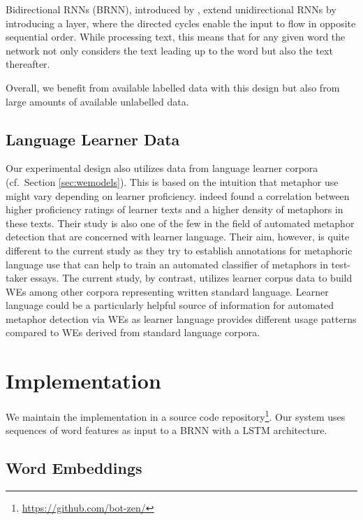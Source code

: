 \documentclass[11pt,a4paper]{article}
\begin{document}
Bidirectional RNNs (BRNN), introduced by , extend unidirectional RNNs by introducing a layer, where the directed cycles enable the input to flow in opposite sequential order. 
While processing text, this means that for any given word the network not only considers the text leading up to the word but also the text thereafter.

Overall, we benefit from available labelled data with this design but
also from large amounts of available unlabelled data.


\subsection{Language Learner Data} %

Our experimental design also utilizes data from language learner corpora (cf.~Section \ref{sec:wemodels}). This is based on the intuition that metaphor use might vary depending on learner proficiency.
indeed found a correlation between higher proficiency ratings of learner texts and a higher density of metaphors in these texts. Their study is also one of the few in the field of automated metaphor detection that are concerned with learner language. Their aim, however, is quite different to the current study as they try to establish annotations for metaphoric language use that can help to train an automated classifier of metaphors in test-taker essays. The current study, by contrast, utilizes learner corpus data to build WEs among other corpora representing written standard language. Learner language could be a particularly helpful source of information for automated metaphor detection via WEs as learner language provides different usage patterns compared to WEs derived from standard language corpora.


\section{Implementation} %
\label{sec:implementation}

We maintain the implementation in a source code repository\footnote{\url{https://github.com/bot-zen/}}.
Our system uses sequences of word features as input to a BRNN with a LSTM architecture.


\subsection{Word Embeddings} %
\end{document}
